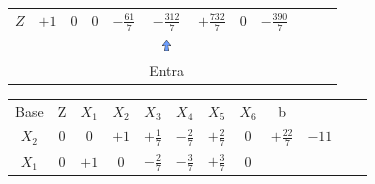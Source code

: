 \begin{frame}
{\begin{table}
\begin{tabular}{c c c c c c c c c c c c}
				\cellcolor{blue!100} \color{white} $\scriptstyle Z$
				& \cellcolor{yellow!50} $\scriptstyle +1$
				& \cellcolor{yellow!50} $\scriptstyle 0$
				& \cellcolor{yellow!50} $\scriptstyle 0$
				& \cellcolor{yellow!50} $\scriptstyle -\frac{61}{7}$
				& \cellcolor{gray!50} $\scriptstyle -\frac{312}{7}$
				& \cellcolor{yellow!50} $\scriptstyle +\frac{732}{7}$
				& \cellcolor{yellow!50} $\scriptstyle 0$ 
				& \cellcolor{gray!50} $\scriptstyle -\frac{390}{7}$  \\
				& & & & & \includegraphics[width=0.3cm,height=0.3cm]{setacima.jpg} \\
				& & & & & \scriptsize Entra \\
			\end{tabular}
		\end{table}			
	}
	{
		\begin{table}		
			\begin{tabular}{c c c c c c c c c c c c}
				\cline{1-8} 
				\cellcolor{blue!100} \color{white} \scriptsize Base 
				&\cellcolor{blue!100} \color{red} \scriptsize Z 
				&\cellcolor{blue!100} \color{red} $\scriptstyle X_1$ 
				&\cellcolor{blue!100} \color{red} $\scriptstyle X_2$ 
				&\cellcolor{blue!100} \color{white}   $\scriptstyle X_3$ 
				&\cellcolor{blue!100} \color{white} $\scriptstyle X_4$ 
				&\cellcolor{blue!100} \color{white}   $\scriptstyle X_5$ 
				&\cellcolor{blue!100} \color{red}   $\scriptstyle X_6$ 
				&\cellcolor{blue!100} \color{white} \scriptsize b \\
				\cellcolor{blue!100} \color{red} $\scriptstyle X_2$
				& \cellcolor{yellow!50} $\scriptstyle 0$
				& \cellcolor{yellow!50} $\scriptstyle 0$
				& \cellcolor{yellow!50} $\scriptstyle +1$
				& \cellcolor{yellow!50} $\scriptstyle +\frac{1}{7}$
				& \cellcolor{gray!50} $\scriptstyle -\frac{2}{7}$
				& \cellcolor{yellow!50} $\scriptstyle +\frac{2}{7}$
				& \cellcolor{yellow!50} $\scriptstyle 0$
				& \cellcolor{gray!50} $\scriptstyle +\frac{22}{7}$
				& $ \scriptstyle -11$ \\
			    \cellcolor{blue!100} \color{red} $\scriptstyle X_1$
				& \cellcolor{yellow!50} $\scriptstyle 0$
				& \cellcolor{yellow!50} $\scriptstyle +1$
				& \cellcolor{yellow!50} $\scriptstyle 0$
				& \cellcolor{yellow!50} $\scriptstyle -\frac{2}{7}$			
				& \cellcolor{gray!50} $\scriptstyle -\frac{3}{7}$
				& \cellcolor{yellow!50} $\scriptstyle +\frac{3}{7}$
				& \cellcolor{yellow!50} $\scriptstyle 0$ 

\end{tabular}
\end{table}}
\end{frame}

